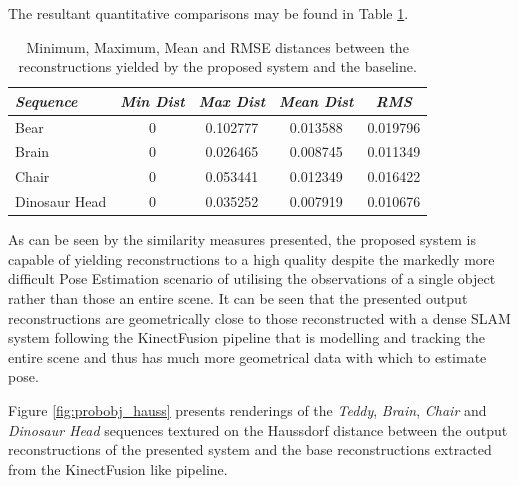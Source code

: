 The resultant quantitative comparisons may be found in Table \ref{tbl:probobj_hauss}.
\begin{table}[ht]
  \label{tbl:probobj_hauss}
  \centering
  \begin{tabular}{lcccc}
    \emph{Sequence} & \emph{Min Dist} & \emph{Max Dist} & \emph{Mean Dist} & \emph{RMS}\\
    \midrule
    \textsf{Bear} & 0 & 0.102777 & 0.013588 & 0.019796 \\
    \textsf{Brain} & 0 & 0.026465 & 0.008745 & 0.011349 \\
    \textsf{Chair} & 0 & 0.053441 & 0.012349 & 0.016422 \\
    \textsf{Dinosaur Head} & 0 & 0.035252 & 0.007919 & 0.010676
  \end{tabular}
  \caption{Minimum, Maximum, Mean and RMSE distances between the reconstructions yielded by 
  the proposed system and the baseline.}
\end{table}

As can be seen by the similarity measures presented, the proposed system is capable of 
yielding reconstructions to a high quality despite the markedly more difficult Pose Estimation 
scenario of utilising the observations of a single object rather than those an entire scene. 
It can be seen that the presented output reconstructions are geometrically close to those 
reconstructed with a dense SLAM system \cite{Prisacariu2014} following the KinectFusion 
\cite{Newcombe2011} pipeline that is modelling and tracking the entire scene and thus has 
much more geometrical data with which to estimate pose.

Figure \ref{fig:probobj_hauss} presents renderings of the \textit{Teddy}, 
\textit{Brain}, \textit{Chair} and \textit{Dinosaur Head} sequences textured 
on the Haussdorf distance between the output reconstructions of the presented 
system and the base reconstructions extracted from the KinectFusion like pipeline.

